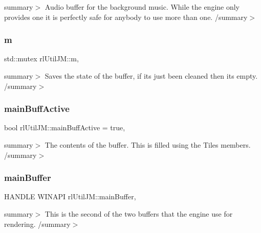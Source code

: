 summary$>$ Audio buffer for the background music. While the engine only provides one it is perfectly safe for anybody to use more than one. /summary$>$ \mbox{\label{classrl_util_j_m_a1a8bbd1ef16d9c99251e5a43cc5000fc}} 
\subsubsection{\texorpdfstring{m}{m}}
{\footnotesize\ttfamily std\+::mutex rl\+Util\+J\+M\+::m\hspace{0.3cm}{\ttfamily [static]}, {\ttfamily [private]}}

summary$>$ Saves the state of the buffer, if it\textquotesingle{}s just been cleaned then it\textquotesingle{}s empty. /summary$>$ \mbox{\label{classrl_util_j_m_a179ab751158e2eb284cc711404e89604}} 
\subsubsection{\texorpdfstring{main\+Buff\+Active}{mainBuffActive}}
{\footnotesize\ttfamily bool rl\+Util\+J\+M\+::main\+Buff\+Active = true\hspace{0.3cm}{\ttfamily [static]}, {\ttfamily [private]}}

summary$>$ The contents of the buffer. This is filled using the Tiles members. /summary$>$ \mbox{\label{classrl_util_j_m_a3682e4076d4df42fa3bc753bfce1c96b}} 
\subsubsection{\texorpdfstring{main\+Buffer}{mainBuffer}}
{\footnotesize\ttfamily H\+A\+N\+D\+LE W\+I\+N\+A\+PI rl\+Util\+J\+M\+::main\+Buffer\hspace{0.3cm}{\ttfamily [static]}, {\ttfamily [private]}}

summary$>$ This is the second of the two buffers that the engine use for rendering. /summary$>$ \mbox{\label{classrl_util_j_m_af674b0f94fe8beb836cb2d416109e52c}} 
